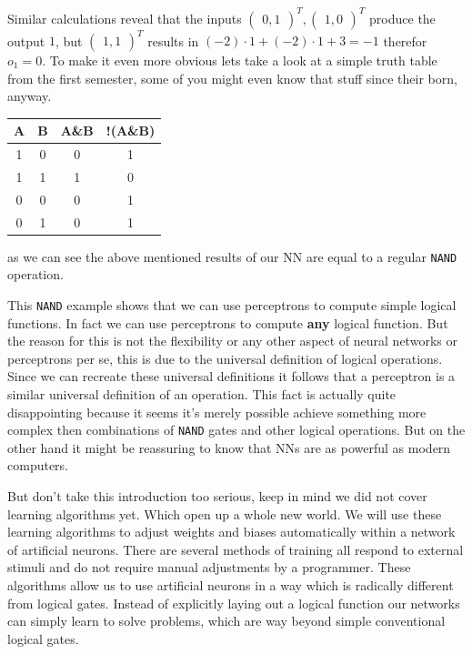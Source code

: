 \documentclass[10pt]{book}
\begin{document}
    Similar calculations reveal that the inputs \(\begin{pmatrix}0, 1\end{pmatrix}^T, \begin{pmatrix}1, 0\end{pmatrix}^T\) produce the output
    \(1\), but \(\begin{pmatrix}1, 1\end{pmatrix}^T\) results in \((-2)\cdot 1 + (-2)\cdot 1 + 3 = -1\) therefor \(o_1 = 0\).
    To make it even more obvious lets take a look at a simple truth table from the first semester, some of you might even know that stuff since their born, anyway.
    \begin{center}
        \begin{tabular}{c|c|c|c}
            A & B & A\&B & !(A\&B)\\
            \hline
            1 & 0 & 0 & 1\\
            1 & 1 & 1 & 0\\
            0 & 0 & 0 & 1\\
            0 & 1 & 0 & 1\\
        \end{tabular}
    \end{center}
    as we can see the above mentioned results of our NN are equal to a regular \lstinline{NAND} operation.

    This \lstinline{NAND} example shows that we can use perceptrons to compute simple logical functions. In fact we can use 
    perceptrons to compute \textbf{any} logical function. But the reason for this is not the flexibility or any other aspect of neural networks
    or perceptrons per se, this is due to the universal definition of logical operations.
    Since we can recreate these universal definitions it follows that a perceptron is a similar universal definition of an operation.
    This fact is actually quite disappointing because it seems it's merely possible achieve something more complex then combinations of \lstinline{NAND}
    gates and other logical operations. But on the other hand it might be reassuring to know that NNs are as powerful as modern computers.

    But don't take this introduction too serious, keep in mind we did not cover learning algorithms yet. Which open up
    a whole new world. We will use these learning algorithms to adjust weights and biases automatically within a network of
    artificial neurons. There are several methods of training all respond to external stimuli and do not require manual adjustments by
    a programmer. These algorithms allow us to use artificial neurons in a way which is radically different from
    logical gates. Instead of explicitly laying out a logical function our networks can simply learn to solve problems, which are way beyond
    simple conventional logical gates.
    
\end{document}
